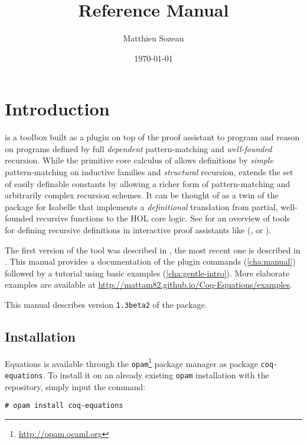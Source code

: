 \documentclass{report}
\author{Matthieu Sozeau}
\date{\today}
\title{\Equations \eqnversion Reference Manual}
\def\eqnversion{\texttt{1.3beta2}\xspace}
\begin{document}
\maketitle

\def\coqlibrary#1#2#3{}

\def\Equations{\texorpdfstring{\name{Equations}}{Equations}}

\chapter*{Introduction}
\label{cha:introduction}

\Equations is a toolbox built as a plugin on top of the \Coq proof assistant
to program and reason on programs defined by full \emph{dependent}
pattern-matching and \emph{well-founded} recursion. While the primitive
core calculus of \Coq allows definitions by \emph{simple} pattern-matching on
inductive families and \emph{structural} recursion, \Equations extends
the set of easily definable constants by allowing a richer form of
pattern-matching and arbitrarily complex recursion schemes. It can be
thought of as a twin of the  package for Isabelle that
implements a \emph{definitional} translation from partial, well-founded
recursive functions to the HOL core logic. See
\cite{BoveKraussSozeau2011} for an overview of tools for defining
recursive definitions in interactive proof assistants like (\Coq, \Agda
or \Isabelle).

The first version of the tool was described in
\cite{sozeau.Coq/Equations/ITP10}, the most recent one is described in
\cite{equationsreloaded}. This manual provides a documentation of the plugin
commands (\autoref{cha:manual}) followed by a tutorial using basic
examples (\autoref{cha:gentle-intro}).  More elaborate examples are
available at \url{http://mattam82.github.io/Coq-Equations/examples}.

This manual describes version \eqnversion of the package.

\section*{Installation}

Equations is available through the
\texttt{opam}\footnote{\url{http://opam.ocaml.org}} package manager as
package \texttt{coq-equations}. To install it on an already existing
\texttt{opam} installation with the \Coq repository, simply input the
command:
\begin{verbatim}
# opam install coq-equations
\end{verbatim}
\end{document}
